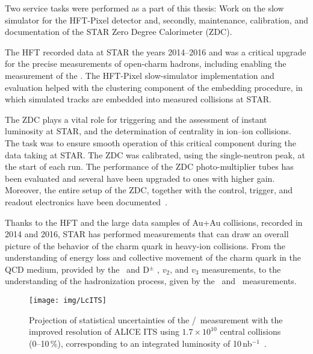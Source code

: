 Two service tasks were performed as a part of this thesis: Work on the slow simulator for the HFT-Pixel detector and, secondly, maintenance, calibration, and documentation of the STAR Zero Degree Calorimeter (ZDC). 

The HFT recorded data at STAR the years 2014--2016 and was a critical upgrade for the precise measurements of open-charm hadrons, including enabling the measurement of the \Lambdac\@. The HFT-Pixel slow-simulator implementation and evaluation helped with the clustering component of the embedding procedure, in which simulated tracks are embedded into measured collisions at STAR\@. 

The ZDC plays a vital role for triggering and the assessment of instant luminosity at STAR, and the determination of centrality in ion--ion collisions. The task was to ensure smooth operation of this critical component during the data taking at STAR\@. The ZDC was calibrated, using the single-neutron peak, at the start of each run. The performance of the ZDC photo-multiplier tubes has been evaluated and several have been upgraded to ones with higher gain. Moreover, the entire setup of the ZDC, together with the control, trigger, and readout electronics have been documented~\cite{ZDCmanual}\@.

Thanks to the HFT and the large data samples of Au+Au collisions, recorded in 2014 and 2016, STAR has performed measurements that can draw an overall picture of the behavior of the charm quark in heavy-ion collisions. From the understanding of energy loss and collective movement of the charm quark in the QCD medium, provided by the \dzero\ and D$^\pm$ \Raa, $v_2$, and $v_3$ measurements, to the understanding of the hadronization process, given by the \Lambdac\ and \Ds\ measurements.

\begin{figure}[!htb]
\centering
\texttt{[image: img/LcITS]}
\caption[Projection of statistical uncertainties of the \Lambdac/\dzero\ measurement with the improved resolution of ALICE ITS\@.]{Projection of statistical uncertainties of the \Lambdac/\dzero\ measurement with the improved resolution of ALICE ITS using $1.7\times 10^{10}$ central collisions (0--10$\,\%$), corresponding to an integrated luminosity of 10$\,$nb$^{-1}$~\cite{ITS_CDR}.}
\label{ITS_Lc_conclusion}
\end{figure}

